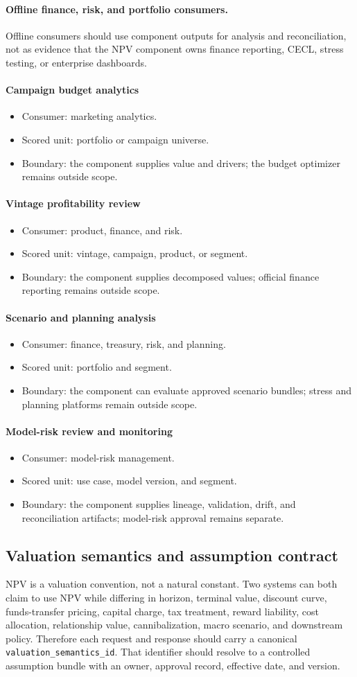 \documentclass[11pt]{article}
\newcommand{\1}{\mathbf{1}}
\newcommand{\code}[1]{\nolinkurl{#1}}
\newcommand{\contractitem}[2]{\paragraph{#1}\begin{itemize}[leftmargin=1.5em,itemsep=0.12em,topsep=0.18em]#2\end{itemize}}
\begin{document}
\paragraph{Offline finance, risk, and portfolio consumers.}
Offline consumers should use component outputs for analysis and reconciliation,
not as evidence that the NPV component owns finance reporting, CECL, stress
testing, or enterprise dashboards.

\contractitem{Campaign budget analytics}{
  \item Consumer: marketing analytics.
  \item Scored unit: portfolio or campaign universe.
  \item Boundary: the component supplies value and drivers; the budget
        optimizer remains outside scope.
}
\contractitem{Vintage profitability review}{
  \item Consumer: product, finance, and risk.
  \item Scored unit: vintage, campaign, product, or segment.
  \item Boundary: the component supplies decomposed values; official finance
        reporting remains outside scope.
}
\contractitem{Scenario and planning analysis}{
  \item Consumer: finance, treasury, risk, and planning.
  \item Scored unit: portfolio and segment.
  \item Boundary: the component can evaluate approved scenario bundles; stress
        and planning platforms remain outside scope.
}
\contractitem{Model-risk review and monitoring}{
  \item Consumer: model-risk management.
  \item Scored unit: use case, model version, and segment.
  \item Boundary: the component supplies lineage, validation, drift, and
        reconciliation artifacts; model-risk approval remains separate.
}

\subsection{Valuation semantics and assumption contract}
\label{subsec:valuation-semantics}

NPV is a valuation convention, not a natural constant. Two systems can both
claim to use NPV while differing in horizon, terminal value, discount curve,
funds-transfer pricing, capital charge, tax treatment, reward liability, cost
allocation, relationship value, cannibalization, macro scenario, and downstream
policy. Therefore each request and response should carry a canonical
\code{valuation_semantics_id}. That identifier should resolve to a controlled
assumption bundle with an owner, approval record, effective date, and version.
\end{document}
